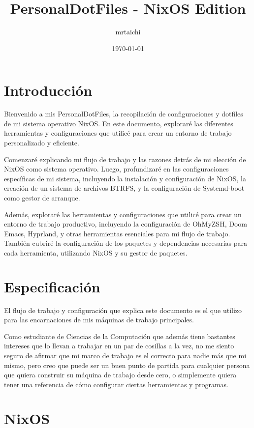 \documentclass[11pt]{article}
\author{mrtaichi}
\date{\today}
\title{PersonalDotFiles - NixOS Edition}
\begin{document}
\maketitle
\tableofcontents

\section{Introducción}
\label{sec:org6081e9b}

Bienvenido a mis PersonalDotFiles, la recopilación de configuraciones y dotfiles de mi sistema operativo NixOS. En este documento, exploraré las diferentes herramientas y configuraciones que utilicé para crear un entorno de trabajo personalizado y eficiente.

Comenzaré explicando mi flujo de trabajo y las razones detrás de mi elección de NixOS como sistema operativo. Luego, profundizaré en las configuraciones específicas de mi sistema, incluyendo la instalación y configuración de NixOS, la creación de un sistema de archivos BTRFS, y la configuración de Systemd-boot como gestor de arranque.

Además, exploraré las herramientas y configuraciones que utilicé para crear un entorno de trabajo productivo, incluyendo la configuración de OhMyZSH, Doom Emacs, Hyprland, y otras herramientas esenciales para mi flujo de trabajo. También cubriré la configuración de los paquetes y dependencias necesarias para cada herramienta, utilizando NixOS y su gestor de paquetes.
\section{Especificación}
\label{sec:org50c7e6d}

El flujo de trabajo y configuración que explica este documento es el que utilizo para las encarnaciones de mis máquinas de trabajo principales.

Como estudiante de Ciencias de la Computación que además tiene bastantes intereses que lo llevan a trabajar en un par de cosillas a la vez, no me siento seguro de afirmar que mi marco de trabajo es el correcto para nadie más que mi mismo, pero creo que puede ser un buen punto de partida para cualquier persona que quiera construir su máquina de trabajo desde cero, o simplemente quiera tener una referencia de cómo configurar ciertas herramientas y programas.
\section{NixOS}
\label{sec:org6896349}
\end{document}
